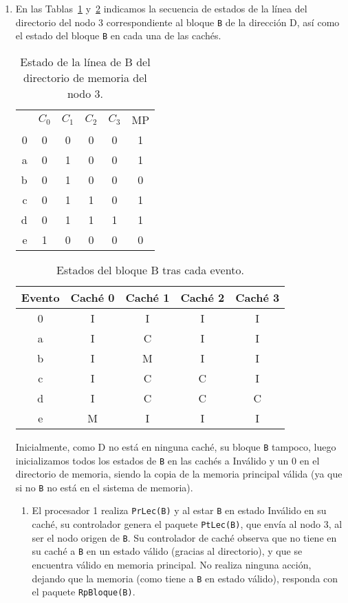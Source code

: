 \begin{ejercicio}
\begin{enumerate}
    \item En las Tablas~\ref{tab:ej_rel3_3} y~\ref{tab:ej_rel3_3_2} indicamos la secuencia de estados de la línea del directorio del nodo 3 correspondiente al bloque \verb|B| de la dirección D, así como el estado del bloque \verb|B| en cada una de las cachés.

\begin{table}[H]
\centering
\begin{tabular}{r|c|c|c|c|c|}
    & $C_0$ & $C_1$ & $C_2$ & $C_3$ & MP \\
    \cline{2-6}
    0 & 0 & 0 & 0 & 0 & 1 \\
    \cline{2-6}
    a & 0 & 1 & 0 & 0 & 1 \\
    \cline{2-6}
    b & 0 & 1 & 0 & 0 & 0 \\
    \cline{2-6}
    c & 0 & 1 & 1 & 0 & 1 \\
    \cline{2-6}
    d & 0 & 1 & 1 & 1 & 1 \\
    \cline{2-6}
    e & 1 & 0 & 0 & 0 & 0 \\
    \cline{2-6}
\end{tabular}
\caption{Estado de la línea de B del directorio de memoria del nodo 3.}
\label{tab:ej_rel3_3}
\end{table}

\begin{table}[H]
\centering
\begin{tabular}{c|c|c|c|c}
    Evento & Caché 0 & Caché 1 & Caché 2 & Caché 3 \\
    \hline
    0 & I & I & I & I \\
    \hline
    a & I & C & I & I \\
    \hline
    b & I & M & I & I \\
    \hline
    c & I & C & C & I \\
    \hline
    d & I & C & C & C \\
    \hline
    e & M & I & I & I \\
\end{tabular}
\caption{Estados del bloque B tras cada evento.}
\label{tab:ej_rel3_3_2}
\end{table}
Inicialmente, como D no está en ninguna caché, su bloque \verb|B| tampoco, luego inicializamos todos los estados de \verb|B| en las cachés a Inválido y un 0 en el directorio de memoria, siendo la copia de la memoria principal válida (ya que si no \verb|B| no está en el sistema de memoria).

    \begin{enumerate}
        \item El procesador 1 realiza \verb|PrLec(B)| y al estar \verb|B| en estado Inválido en su caché, su controlador genera el paquete \verb|PtLec(B)|, que envía al nodo 3, al ser el nodo origen de \verb|B|. Su controlador de caché observa que no tiene en su caché a \verb|B| en un estado válido (gracias al directorio), y que se encuentra válido en memoria principal. No realiza ninguna acción, dejando que la memoria (como tiene a \verb|B| en estado válido), responda con el paquete \verb|RpBloque(B)|. 


\end{enumerate}
\end{enumerate}
\end{ejercicio}
